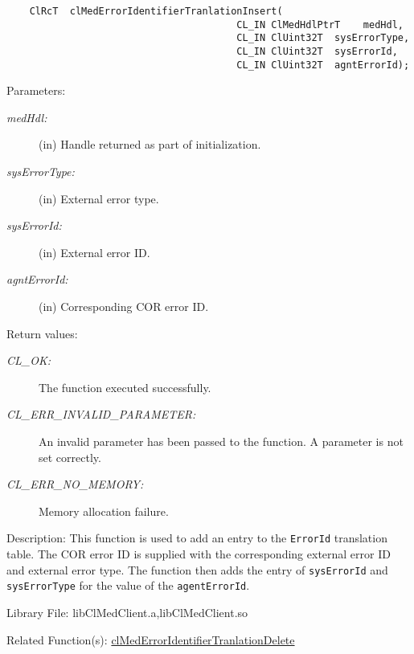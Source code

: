 \begin{flushleft}
\begin{Desc}
\footnotesize\begin{verbatim}    ClRcT  clMedErrorIdentifierTranlationInsert(
                                  		CL_IN ClMedHdlPtrT    medHdl,
                                  		CL_IN ClUint32T  sysErrorType,
                                  		CL_IN ClUint32T  sysErrorId,
                                  		CL_IN ClUint32T  agntErrorId);
\end{verbatim}
\normalsize
\end{Desc}
\begin{Desc}
\item[Parameters:]
\begin{description}
\item[{\em med\-Hdl:}](in) Handle returned as part of initialization. 
\item[{\em sys\-Error\-Type:}](in) External error type. 
\item[{\em sys\-Error\-Id:}](in) External error ID. 
\item[{\em agnt\-Error\-Id:}](in) Corresponding COR error ID.\end{description}
\end{Desc}
\begin{Desc}
\item[Return values:]
\begin{description}
\item[{\em CL\_\-OK:}]The function executed successfully. 
\item[{\em CL\_\-ERR\_\-INVALID\_\-PARAMETER:}]An invalid parameter has been passed to the function. A parameter is not set correctly. 
\item[{\em CL\_\-ERR\_\-NO\_\-MEMORY:}]Memory allocation failure.\end{description}
\end{Desc}
\begin{Desc}
\item[Description:]This function is used to add an entry to the {\tt{Error\-Id}} translation table. The COR error ID is supplied with the corresponding
external error ID and external error type. The function then adds the entry of {\tt{sys\-Error\-Id}} and {\tt{sys\-Error\-Type}} for the value of the
{\tt{agent\-Error\-Id}}.\end{Desc}
\begin{Desc}
\item[Library File:]lib\-Cl\-Med\-Client.a,lib\-Cl\-Med\-Client.so\end{Desc}
\begin{Desc}
\item[Related Function(s):]\hyperlink{pagemed107}{cl\-Med\-Error\-Identifier\-Tranlation\-Delete} \end{Desc}
\newpage


\end{flushleft}
